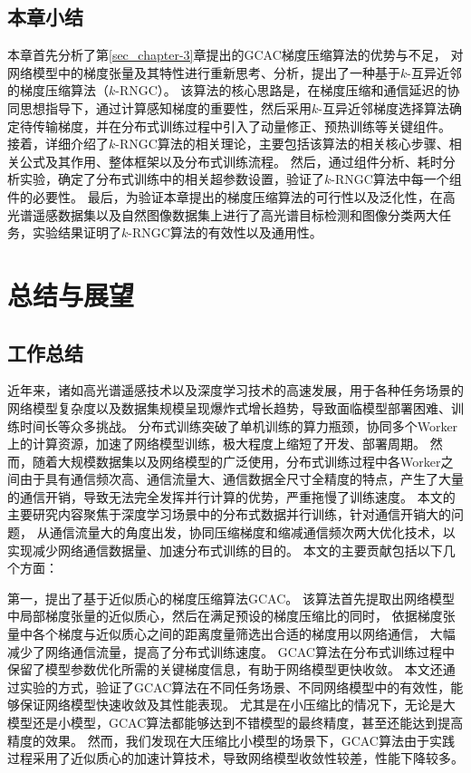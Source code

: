 \documentclass{xdupgthesis}
\begin{document}
\section{本章小结}
\label{sec_chapter4-Summary}
本章首先分析了第\ref*{sec_chapter-3}章提出的GCAC梯度压缩算法的优势与不足，
对网络模型中的梯度张量及其特性进行重新思考、分析，提出了一种基于$k$-互异近邻的梯度压缩算法（$k$-RNGC）。
该算法的核心思路是，在梯度压缩和通信延迟的协同思想指导下，通过计算感知梯度的重要性，然后采用$k$-互异近邻梯度选择算法确定待传输梯度，并在分布式训练过程中引入了动量修正、预热训练等关键组件。
接着，详细介绍了$k$-RNGC算法的相关理论，主要包括该算法的相关核心步骤、相关公式及其作用、整体框架以及分布式训练流程。
然后，通过组件分析、耗时分析实验，确定了分布式训练中的相关超参数设置，验证了$k$-RNGC算法中每一个组件的必要性。
最后，为验证本章提出的梯度压缩算法的可行性以及泛化性，在高光谱遥感数据集以及自然图像数据集上进行了高光谱目标检测和图像分类两大任务，实验结果证明了$k$-RNGC算法的有效性以及通用性。



\chapter{总结与展望}
\section{工作总结}
近年来，诸如高光谱遥感技术以及深度学习技术的高速发展，用于各种任务场景的网络模型复杂度以及数据集规模呈现爆炸式增长趋势，导致面临模型部署困难、训练时间长等众多挑战。
分布式训练突破了单机训练的算力瓶颈，协同多个Worker上的计算资源，加速了网络模型训练，极大程度上缩短了开发、部署周期。
然而，随着大规模数据集以及网络模型的广泛使用，分布式训练过程中各Worker之间由于具有通信频次高、通信流量大、通信数据全尺寸全精度的特点，产生了大量的通信开销，导致无法完全发挥并行计算的优势，严重拖慢了训练速度。
本文的主要研究内容聚焦于深度学习场景中的分布式数据并行训练，针对通信开销大的问题，
从通信流量大的角度出发，协同压缩梯度和缩减通信频次两大优化技术，以实现减少网络通信数据量、加速分布式训练的目的。
本文的主要贡献包括以下几个方面：

第一，提出了基于近似质心的梯度压缩算法GCAC。
该算法首先提取出网络模型中局部梯度张量的近似质心，然后在满足预设的梯度压缩比的同时，
依据梯度张量中各个梯度与近似质心之间的距离度量筛选出合适的梯度用以网络通信，
大幅减少了网络通信流量，提高了分布式训练速度。
GCAC算法在分布式训练过程中保留了模型参数优化所需的关键梯度信息，有助于网络模型更快收敛。
本文还通过实验的方式，验证了GCAC算法在不同任务场景、不同网络模型中的有效性，能够保证网络模型快速收敛及其性能表现。
尤其是在小压缩比的情况下，无论是大模型还是小模型，GCAC算法都能够达到不错模型的最终精度，甚至还能达到提高精度的效果。
然而，我们发现在大压缩比小模型的场景下，GCAC算法由于实践过程采用了近似质心的加速计算技术，导致网络模型收敛性较差，性能下降较多。
\end{document}
